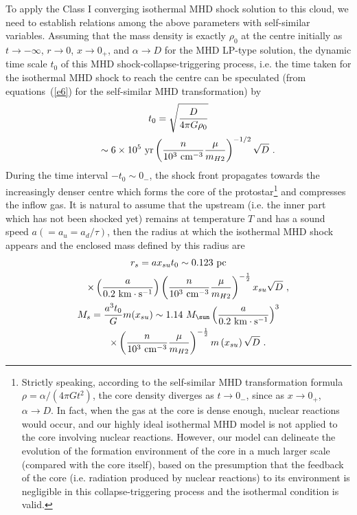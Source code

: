 \documentclass[fleqn,usenatbib]{mnras}
\begin{document}
To apply the Class I converging isothermal MHD shock solution to this cloud, we need to establish relations among the above parameters with self-similar variables. Assuming that the mass density is exactly $\rho_{0}$ at the centre initially as $t\rightarrow -\infty$, $r\rightarrow 0$, $x\rightarrow 0_{+}$, and $\alpha\rightarrow D$ for the MHD LP-type solution, the dynamic time scale $t_{0}$ of this MHD shock-collapse-triggering process, i.e. the time taken for the isothermal MHD shock to reach the centre can be speculated (from equations~(\ref{e6}) for the self-similar MHD transformation) by 
\begin{gather}
t_{0}=\sqrt{\frac{D}{4\pi G\rho_{0}}}\notag\\
\qquad\sim 6\times 10^{5}~\mathrm{yr} \left(\frac{n}{10^{3}~\mathrm{cm^{-3}}}
 \frac{\mu}{m_{H2}}\right)^{-1/2}\sqrt{D}\ .\label{e44}
\end{gather}
During the time interval $-t_{0}\sim 0_{-}$, the shock front propagates towards the increasingly denser centre which forms the core of the protostar\footnote{\label{f14}Strictly speaking, according to the self-similar MHD transformation formula $\rho=\alpha/\left(4\pi Gt^{2}\right)$, the core density diverges as $t\rightarrow 0_{-}$, since as $x\rightarrow 0_{+}$, $\alpha\rightarrow D$. In fact, when the gas at the core is dense enough, nuclear reactions would occur, and our highly ideal isothermal MHD model is not applied to the core involving nuclear reactions. However, our model can delineate the evolution of the formation environment of the core in a much larger scale (compared with the core itself), based on the presumption that the feedback of the core (i.e. radiation produced by nuclear reactions) to its environment is negligible in this collapse-triggering process and the isothermal condition is valid.} and compresses the inflow gas. It is natural to assume that the upstream (i.e. the inner part which has not been shocked yet) remains at temperature $T$ and has a sound speed $a(=a_{u}=a_{d}/\tau)$, then the radius at which the isothermal MHD shock appears and the enclosed mass defined by this radius are
\begin{gather}
r_{s}=a x_{su}t_{0}\sim 0.123~\mathrm{pc}\notag\\
\qquad\times \left(\frac{a}{0.2~\mathrm{km\cdot s^{-1}}}\right)\left(\frac{n}{10^{3}~\mathrm{cm^{-3}}}\frac{\mu}{m_{H2}}\right)^{-\frac{1}{2}}x_{su}\sqrt{D}\ ,\label{e45}\\
M_{s}=\frac{a^{3}t_{0}}{G}m(x_{su})\sim 1.14~M_{\sun}\left(\frac{a}{0.2~\mathrm{km\cdot s^{-1}}}\right)^{3}\notag\\
\qquad\times \left(\frac{n}{10^{3}~\mathrm{cm^{-3}}}\frac{\mu}{m_{H2}}\right)^{-\frac{1}{2}}m\left(x_{su}\right)\sqrt{D}\ .\label{e46}
\end{gather}
\end{document}
